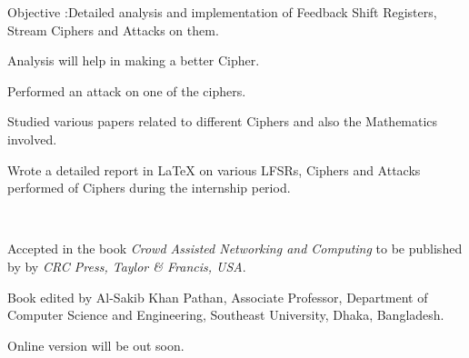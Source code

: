 \documentclass[]{deedy-resume-openfont}
\begin{document}
\begin{minipage}[t]{0.66\textwidth}
\vspace{\topsep}
\begin{tightemize}
    \item Objective :Detailed analysis and implementation of Feedback Shift Registers, Stream Ciphers and Attacks on them.
    \item Analysis will help in making a better Cipher.
    \item Performed an attack on one of the ciphers.
    \item Studied various papers related to different Ciphers and also the Mathematics involved.
    \item Wrote a detailed report in \LaTeX{} on various LFSRs, Ciphers and Attacks performed of Ciphers during the internship period.
\end{tightemize}
\sectionsep

\\
\vspace{\topsep}
\begin{tightemize}
    \item Accepted in the book \emph{Crowd Assisted Networking and Computing}  to be published by by \emph{CRC Press, Taylor \& Francis, USA}.
    \item Book edited by Al-Sakib Khan Pathan, Associate Professor, Department of Computer Science and Engineering, Southeast University, Dhaka, Bangladesh.
    \item Online version will be out soon.
\end{tightemize}
\sectionsep


\end{minipage}
\newpage
\end{document}
